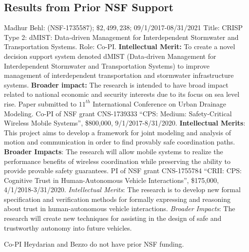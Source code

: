 \subsection{Results from Prior NSF Support}
\label{subsec:prior}

Madhur Behl: (NSF-1735587); $\$2,499,238$; 09/1/2017-08/31/2021 Title: CRISP Type 2: dMIST: Data-driven Management for Interdependent Stormwater and Transportation Systems. Role: Co-PI. \textbf{Intellectual Merit:} To create a novel decision support system denoted dMIST (Data-driven Management for Interdependent Stormwater and Transportation Systems) to improve management of interdependent transportation and stormwater infrastructure systems. %
\textbf{Broader impact:} The research is intended to have broad impact related to national economic and security interests due to its focus on sea level rise. Paper submitted to $11^{th}$ International Conference on Urban Drainage Modeling. 
Co-PI of NSF grant CNS-1739333 ``CPS: Medium: Safety-Critical Wireless Mobile Systems'', \$800,000, 9/1/2017-8/31/2020. \textbf{Intellectual Merits}: This project aims to develop a framework for joint modeling and analysis of motion and communication in order to find provably safe coordination paths. \textbf{Broader Impacts}: The research will allow mobile systems to realize the performance benefits of wireless coordination while preserving the ability to provide provable safety guarantees. 
PI of NSF grant CNS-1755784 ``CRII: CPS: Cognitive Trust in Human-Autonomous Vehicle Interactions'', \$175,000, 4/1/2018-3/31/2020.
\emph{Intellectual Merits}: The research is to develop new formal specification and verification methods for formally expressing and reasoning about trust in human-autonomous vehicle interactions.
\emph{Broader Impacts}: The research will create new techniques for assisting in the design of safe and trustworthy autonomy into future vehicles.

Co-PI Heydarian and Bezzo do not have prior NSF funding. 
